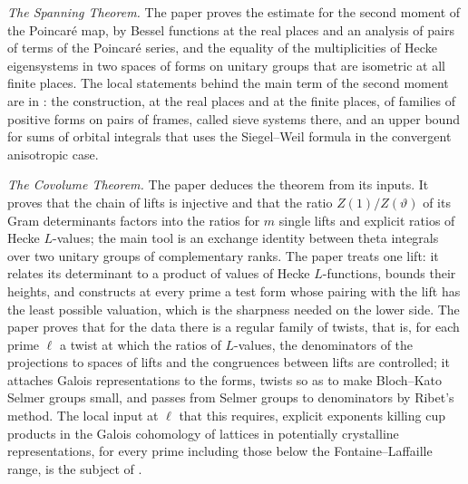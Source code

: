 \documentclass[10pt]{amsart}
\theoremstyle{definition}
\theoremstyle{remark}
\begin{document}
\emph{The Spanning Theorem.} The paper \cite{P51} proves the estimate for the second moment of
the Poincar\'e map, by Bessel functions at the real places and an analysis of pairs of terms
of the Poincar\'e series, and the equality of the multiplicities of Hecke eigensystems in two
spaces of forms on unitary groups that are isometric at all finite places. The local statements
behind the main term of the second moment are in \cite{P52}: the construction, at the real
places and at the finite places, of families of positive forms on pairs of frames, called sieve
systems there, and an upper bound for sums of orbital integrals that uses the Siegel--Weil
formula in the convergent anisotropic case.

\emph{The Covolume Theorem.} The paper \cite{P53} deduces the theorem from its inputs. It proves
that the chain of lifts is injective and that the ratio $Z(1)/Z(\vartheta)$ of its Gram
determinants factors into the ratios for $m$ single lifts and explicit ratios of Hecke
$L$-values; the main tool is an exchange identity between theta integrals over two unitary
groups of complementary ranks. The paper \cite{P54} treats one lift: it relates its determinant
to a product of values of Hecke $L$-functions, bounds their heights, and constructs at every
prime a test form whose pairing with the lift has the least possible valuation, which is the
sharpness needed on the lower side. The paper \cite{P55} proves that for the data there is a
regular family of twists, that is, for each prime $\ell$ a twist at which the ratios of
$L$-values, the denominators of the projections to spaces of lifts and the congruences between
lifts are controlled; it attaches Galois representations to the forms, twists so as to make
Bloch--Kato Selmer groups small, and passes from Selmer groups to denominators by Ribet's
method. The local input at $\ell$ that this requires, explicit exponents killing cup products
in the Galois cohomology of lattices in potentially crystalline representations, for every
prime including those below the Fontaine--Laffaille range, is the subject of \cite{P56}.
\end{document}
